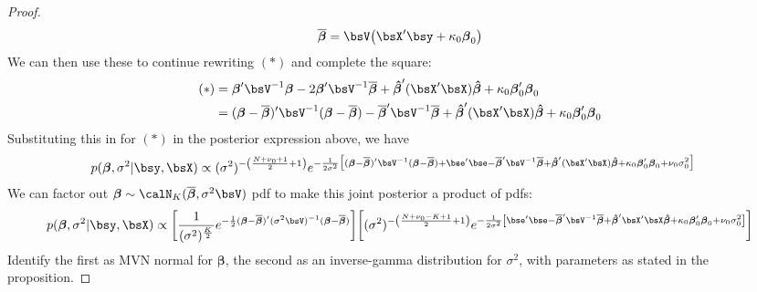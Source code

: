 \documentclass[12pt]{article}
\theoremstyle{plain}
\theoremstyle{definition}
\theoremstyle{remark}
\newcommand{\bsbeta}{\boldsymbol{\beta}}
\newcommand{\bshatbeta}{\boldsymbol{\hat{\beta}}}
\newcommand{\bsbarbeta}{\boldsymbol{\overline{\beta}}}
\begin{document}
\begin{proof}
\begin{align*}
  \bsbarbeta =
  \bsV\big(\bsX'\bsy + \kappa_0\bsbeta_0\big)
\end{align*}
We can then use these to continue rewriting $(*)$ and complete the
square:
\begin{align*}
  (*)
  &=
  \bsbeta'\bsV^{-1}\bsbeta
  - 2\bsbeta'\bsV^{-1}\bsbarbeta
  + \bshatbeta'(\bsX'\bsX)\bshatbeta
  + \kappa_0 \bsbeta_0'\bsbeta_0
  \\
  &=
  (\bsbeta-\bsbarbeta)'\bsV^{-1}(\bsbeta-\bsbarbeta)
  - \bsbarbeta' \bsV^{-1}\bsbarbeta
  + \bshatbeta'(\bsX'\bsX)\bshatbeta
  + \kappa_0 \bsbeta_0'\bsbeta_0
\end{align*}
Substituting this in for $(*)$ in the posterior expression above, we
have
\begin{align*}
  p(\bsbeta, \sigma^2 | \bsy,\bsX)
  &\propto
  (\sigma^2)^{-\left(\frac{N+\nu_0+1}{2}+1\right)}
  e^{%
    -\frac{1}{2\sigma^2}
    \big[
    (\bsbeta-\bsbarbeta)'\bsV^{-1}(\bsbeta-\bsbarbeta)
    +
    \bse'\bse
    - \bsbarbeta' \bsV^{-1}\bsbarbeta
    + \bshatbeta'(\bsX'\bsX)\bshatbeta
    + \kappa_0 \bsbeta_0'\bsbeta_0
    +\nu_0\sigma^2_0
    \big]
  }
\end{align*}
We can factor out $\bsbeta\sim \calN_K(\bsbarbeta,\sigma^2\bsV)$ pdf to
make this joint posterior a product of pdfs:
\begin{align*}
  p(\bsbeta, \sigma^2 | \bsy,\bsX)
  \propto
  \bigg[
  \frac{1}{(\sigma^2)^{\frac{K}{2}}}
  e^{%
    -\frac{1}{2}
    (\bsbeta-\bsbarbeta)'(\sigma^2\bsV)^{-1}(\bsbeta-\bsbarbeta)
  }
  \bigg]
  \bigg[
  (\sigma^2)^{-\left(\frac{N+\nu_0-K+1}{2}+1\right)}
  e^{%
    -\frac{1}{2\sigma^2}
    \left[
    \bse'\bse
    - \bsbarbeta'\bsV^{-1}\bsbarbeta
    + \bshatbeta'\bsX'\bsX\bshatbeta
    + \kappa_0\bsbeta_0'\bsbeta_0
    +\nu_0\sigma^2_0
    \right]
  }
  \bigg]
\end{align*}
Identify the first as MVN normal for $\bsbeta$, the second as an
inverse-gamma distribution for $\sigma^2$, with parameters as stated in
the proposition.
\end{proof}
\end{document}
